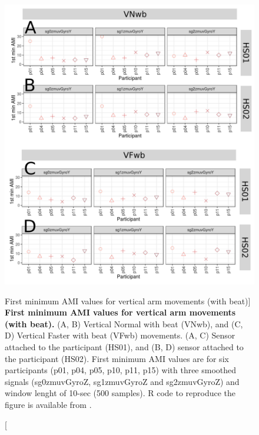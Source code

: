 \begin{figure}
\centering
\includegraphics[width=1.0\textwidth]{ami_Vwb_w10}
	\caption
	[First minimum AMI values for vertical arm movements (with beat)]{
	{\bf First minimum AMI values for vertical arm movements (with beat).}
		(A, B) Vertical Normal with beat (VNwb), and 
		(C, D) Vertical Faster with beat (VFwb) movements.
		(A, C) Sensor attached to the participant (HS01), and
		(B, D) sensor attached to the participant (HS02).
		First minimum AMI values are for six participants 
		(p01, p04, p05, p10, p11, p15) with three smoothed 
		signals (sg0zmuvGyroZ, sg1zmuvGyroZ and sg2zmuvGyroZ) and 
		window lenght of 10-sec (500 samples).
		R code to reproduce the figure is available 
		from \cite{hwum2018}.
        }
    \label{fig:amiVwb}
\end{figure}












